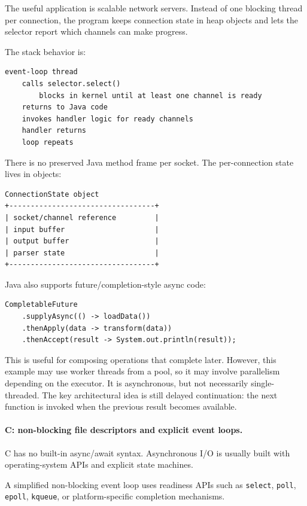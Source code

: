 The useful application is scalable network servers. Instead of one blocking thread per connection, the program keeps connection state in heap objects and lets the selector report which channels can make progress.

The stack behavior is:

\begin{verbatim}
event-loop thread
    calls selector.select()
        blocks in kernel until at least one channel is ready
    returns to Java code
    invokes handler logic for ready channels
    handler returns
    loop repeats
\end{verbatim}

There is no preserved Java method frame per socket. The per-connection state lives in objects:

\begin{verbatim}
ConnectionState object
+----------------------------------+
| socket/channel reference         |
| input buffer                     |
| output buffer                    |
| parser state                     |
+----------------------------------+
\end{verbatim}

Java also supports future/completion-style async code:

\begin{verbatim}
CompletableFuture
    .supplyAsync(() -> loadData())
    .thenApply(data -> transform(data))
    .thenAccept(result -> System.out.println(result));
\end{verbatim}

This is useful for composing operations that complete later. However, this example may use worker threads from a pool, so it may involve parallelism depending on the executor. It is asynchronous, but not necessarily single-threaded. The key architectural idea is still delayed continuation: the next function is invoked when the previous result becomes available.

\paragraph{C: non-blocking file descriptors and explicit event loops.}

C has no built-in async/await syntax. Asynchronous I/O is usually built with operating-system APIs and explicit state machines.

A simplified non-blocking event loop uses readiness APIs such as \texttt{select}, \texttt{poll}, \texttt{epoll}, \texttt{kqueue}, or platform-specific completion mechanisms.

